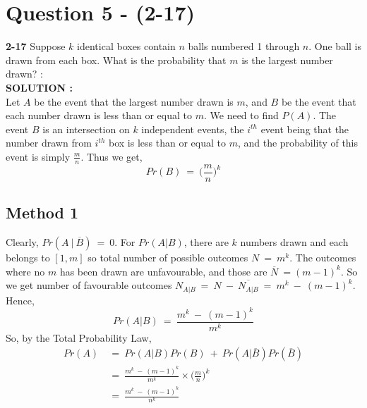 \documentclass{article}
\begin{document}
\section{Question 5 - (2-17)}
\label{Q5}
\textbf{2-17}  Suppose $k$ identical boxes contain $n$ balls numbered 1 through $n$. One ball is drawn from each box. What is the probability that $m$ is the largest number drawn?  : \\

\hspace{1em} \large{\textbf{SOLUTION :}} \\
Let $A$ be the event that the largest number drawn is $m$, and $B$ be the event that each number drawn is less than or equal to $m$. We need to find $P(A)$. The event $B$ is an intersection on $k$ independent events, the $i^{th}$ event being that the number drawn from $i^{th}$ box is less than or equal to $m$, and the probability of this event is simply $\frac{m}{n}$. Thus we get,
\begin{equation*}
    Pr(B)\ =\ \Big(\frac{m}{n}\Big)^k
\end{equation*}
\subsection*{Method 1}
Clearly, $Pr(A\ |\ \overline{B})\ =\ 0$. For $Pr(A|B)$, there are $k$ numbers drawn and each belongs to $[1,m]$ so total number of possible outcomes $N\ =\ m^k$. The outcomes where no $m$ has been drawn are unfavourable, and those are $\overline{N}\ = (m-1)^k$. So we get number of favourable outcomes $N_{A|B}\ =\ N\ -\ \overline{N_{A|B}}\ =\ m^k\ -\ (m-1)^k$. Hence, 
\begin{equation*}
    Pr(A|B)\ = \ \frac{m^k\ -\ (m-1)^k}{m^k}
\end{equation*}
So, by the Total Probability Law,
\begin{equation*}
\begin{split}
Pr(A)\ &= \ Pr(A|B)Pr(B)\ +\ Pr(A|\overline{B})Pr(\overline{B}) \\
       &= \ \frac{m^k\ -\ (m-1)^k}{m^k} \times \Big(\frac{m}{n}\Big)^k \\
       &= \ \frac{m^k\ -\ (m-1)^k}{n^k}
\end{split}
\end{equation*}
\end{document}
